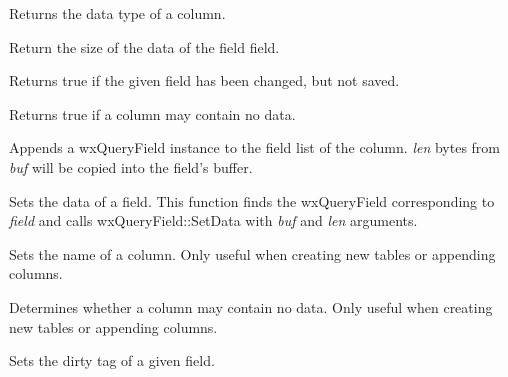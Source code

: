 

Returns the data type of a column.



Return the size of the data of the field field.



Returns true if the given field has been changed, but not saved.



Returns true if a column may contain no data.



Appends a wxQueryField instance to the field list of the column. {\it len} bytes from\rtfsp
{\it buf} will be copied into the field's buffer.



Sets the data of a field. This function finds the wxQueryField corresponding to\rtfsp
{\it field} and calls wxQueryField::SetData with {\it buf} and {\it len} arguments.



Sets the name of a column. Only useful when creating new tables or
appending columns.
 


Determines whether a column may contain no data. Only useful when creating new tables or
appending columns.



Sets the dirty tag of a given field.

